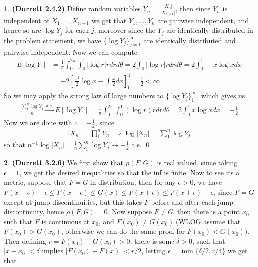\documentclass[10.5pt]{article}
\theoremstyle{definition}
\newtheorem{pb}{}
\newcommand{\set}[1]{\{#1\}}
\newcommand{\abs}[1]{\lvert#1\rvert}
\begin{document}
    \begin{pb}\textbf{(Durrett 2.4.2)}
        Define random variables \(Y_n = \frac{\abs{X_n}}{\abs{X_{n-1}}}\), then since \(Y_n\) is independent of \(X_1,\hdots,X_{n-1}\) we get that \(Y_1,\hdots,Y_n\) are pairwise independent, and hence so are \(\log Y_j\) for each \(j\), moreover since the \(Y_j\) are identically distributed in the problem statement, we have \(\set{\log Y_j}_{j=1}^\infty\) are identically distributed and pairwise independent. Now we can compute
        \begin{align*}
            E\abs{\log Y_1} &= \frac{1}{\pi}\int_0^{2\pi}\int_0^1 \abs{\log r}rdrd\theta = 2\int_0^1 \abs{\log r}rdrd\theta = 2\int_0^1 -x\log x dx \\
            &= -2 \left[\frac{x^2}{2}\log x - \int \frac{x}{2}dx\right]_0^1 = \frac{1}{2} < \infty
        \end{align*}
        So we may apply the strong law of large numbers to \(\set{\log Y_j}_1^\infty\), which gives us
        \begin{align*}
            \frac{\sum_1^n \log Y_j}{n} \overset{\text{a.s.}}{\longrightarrow} E[\log Y_1] = \frac{1}{\pi}\int_0^{2\pi}\int_0^1 (\log r) r drd\theta = 2\int_0^1 x\log x dx = -\frac12
        \end{align*}
        Now we are done with \(c = -\frac12\), since
        \begin{align*}
            \abs{X_n} = \prod_1^n Y_n \implies \log \abs{X_n} = \sum_1^n \log Y_j
        \end{align*}
        so that \(n^{-1}\log \abs{X_n} = \frac{1}{n}\sum_1^n \log Y_j \to -\frac12\) a.s. \qed 
    \end{pb}
    \begin{pb}\textbf{(Durrett 3.2.6)}
        We first show that \(\rho(F,G)\) is real valued, since taking \(\epsilon = 1\), we get the desired inequalities so that the inf is finite. Now to see its a metric, suppose that \(F = G\) in distribution, then for any \(\epsilon > 0\), we have \(F(x- \epsilon) -\epsilon \leq F(x - \epsilon) \leq G(x) \leq F(x + \epsilon) \leq F(x + \epsilon) + \epsilon\), since \(F = G\) except at jump discontinuities, but this takes \(F\) before and after each jump discontinuity, hence \(\rho(F,G) = 0\). Now suppose \(F \neq G\), then there is a point \(x_0\) such that \(F\) is continuous at \(x_0\), and \(F(x_0) \neq G(x_0)\) (WLOG assume that \(F(x_0) > G(x_0)\), otherwise we can do the same proof for \(F(x_0) < G(x_0)\)). Then defining \(r = F(x_0) - G(x_0) > 0\), there is some \(\delta > 0\), such that \(\abs{x-x_0} < \delta\) implies \(\abs{F(x_0) - F(x)} < r/2\), letting \(\epsilon = \min\set{\delta/2,r/4}\) we get that
        \begin{align*}
            
        \end{align*}
    \end{pb}
\end{document}
